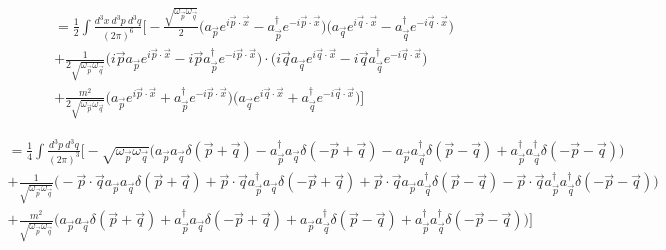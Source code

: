 \documentclass{article}
\begin{document}
\begin{equation} \begin{aligned}
    =\frac{1}{2}\int \frac{d^{3}x\ d^{3}p\ d^{3}q}{(2\pi)^{6}}\Big[ -\frac{\sqrt{\omega_{\vec{p}}\omega_{\vec{q}}}}{2} \Big( a_{\vec{p}}e^{i\vec{p}\cdot{\vec{x}}}
    -a_{\vec{p}}^{\dagger}e^{-i\vec{p}\cdot{\vec{x}}} \Big) \Big( a_{\vec{q}}e^{i\vec{q}\cdot{\vec{x}}}
    -a_{\vec{q}}^{\dagger}e^{-i\vec{q}\cdot{\vec{x}}} \Big)\\
    + \frac{1}{2\sqrt{\omega_{\vec{p}}\omega_{\vec{q}}}} \Big( i\vec{p}a_{\vec{p}}e^{i\vec{p}\cdot{\vec{x}}}-i\vec{p}a_{\vec{p}}^{\dagger}e^{-i\vec{p}\cdot{\vec{x}}} \Big)\cdot{\Big( i\vec{q}a_{\vec{q}}e^{i\vec{q}\cdot{\vec{x}}}-i\vec{q}a_{\vec{q}}^{\dagger}e^{-i\vec{q}\cdot{\vec{x}}}\Big)}\\
    +\frac{m^{2}}{2\sqrt{\omega_{\vec{p}}\omega_{\vec{q}}}} \Big( a_{\vec{p}}e^{i\vec{p}\cdot{\vec{x}}}+a_{\vec{p}}^{\dagger}e^{-i\vec{p}\cdot{\vec{x}}}\Big)\Big(a_{\vec{q}}e^{i\vec{q}\cdot{\vec{x}}}+a_{\vec{q}}^{\dagger}e^{-i\vec{q}\cdot{\vec{x}}} \Big)\Big]\end{aligned}
\end{equation}







\begin{equation} \begin{aligned}
    =\frac{1}{4}\int \frac{d^{3}p\ d^{3}q}{(2\pi)^{3}}\Big[-\sqrt{\omega_{\vec{p}}\omega_{\vec{q}}}\Big(a_{\vec{p}}a_{\vec{q}}\delta(\vec{p}+\vec{q})-a_{\vec{p}}^{\dagger}a_{\vec{q}}\delta(-\vec{p}+\vec{q})-a_{\vec{p}}a_{\vec{q}}^{\dagger}\delta(\vec{p}-\vec{q})+a_{\vec{p}}^{\dagger}a_{\vec{q}}^{\dagger}\delta(-\vec{p}-\vec{q})\Big)\\
    +\frac{1}{\sqrt{\omega_{\vec{p}}\omega_{\vec{q}}}}\Big(-\vec{p}\cdot{\vec{q}}a_{\vec{p}}a_{\vec{q}}\delta(\vec{p}+\vec{q})+\vec{p}\cdot{\vec{q}}a_{\vec{p}}^{\dagger}a_{\vec{q}}\delta(-\vec{p}+\vec{q})+\vec{p}\cdot{\vec{q}}a_{\vec{p}}a_{\vec{q}}^{\dagger}\delta(\vec{p}
    -\vec{q})-\vec{p}\cdot{\vec{q}}a_{\vec{p}}^{\dagger}a_{\vec{q}}^{\dagger}\delta(-\vec{p}-\vec{q})\Big)\\
    +\frac{m^{2}}{\sqrt{\omega_{\vec{p}}\omega_{\vec{q}}}}\Big(a_{\vec{p}}a_{\vec{q}}\delta(\vec{p}+\vec{q})+a_{\vec{p}}^{\dagger}a_{\vec{q}}\delta(-\vec{p}+\vec{q})
    +a_{\vec{p}}a_{\vec{q}}^{\dagger}\delta(\vec{p}-\vec{q})+a_{\vec{p}}^{\dagger}a_{\vec{q}}^{\dagger}\delta(-\vec{p}-\vec{q})\Big)\Big]\end{aligned}
\end{equation}
\end{document}

